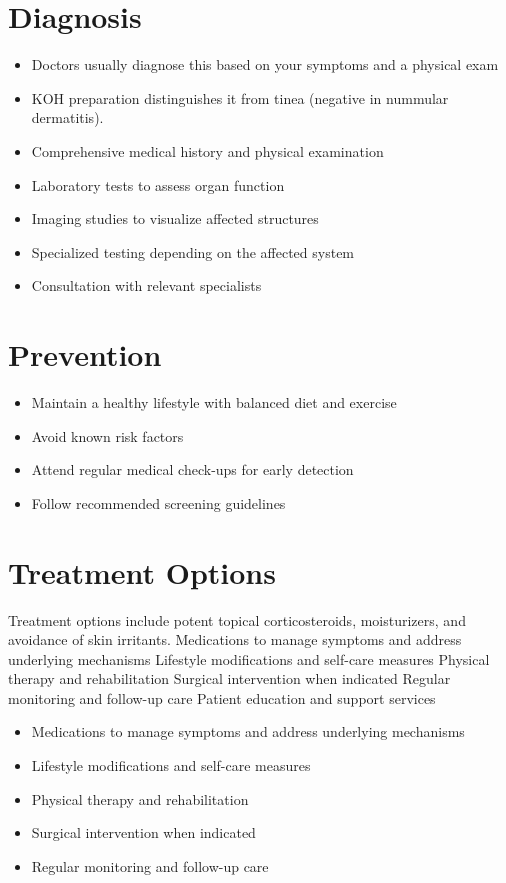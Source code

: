 \section{Diagnosis}
\begin{itemize}[noitemsep]
  \item Doctors usually diagnose this based on your symptoms and a physical exam
  \item KOH preparation distinguishes it from tinea (negative in nummular dermatitis).
  \item Comprehensive medical history and physical examination
  \item Laboratory tests to assess organ function
  \item Imaging studies to visualize affected structures
  \item Specialized testing depending on the affected system
  \item Consultation with relevant specialists
\end{itemize}
\section{Prevention}
\begin{itemize}[noitemsep]
  \item Maintain a healthy lifestyle with balanced diet and exercise
  \item Avoid known risk factors
  \item Attend regular medical check-ups for early detection
  \item Follow recommended screening guidelines
\end{itemize}
\section{Treatment Options}
Treatment options include potent topical corticosteroids, moisturizers, and avoidance of skin irritants. Medications to manage symptoms and address underlying mechanisms Lifestyle modifications and self-care measures Physical therapy and rehabilitation Surgical intervention when indicated Regular monitoring and follow-up care Patient education and support services

\begin{itemize}[noitemsep]
  \item Medications to manage symptoms and address underlying mechanisms
  \item Lifestyle modifications and self-care measures
  \item Physical therapy and rehabilitation
  \item Surgical intervention when indicated
  \item Regular monitoring and follow-up care
\end{itemize}
